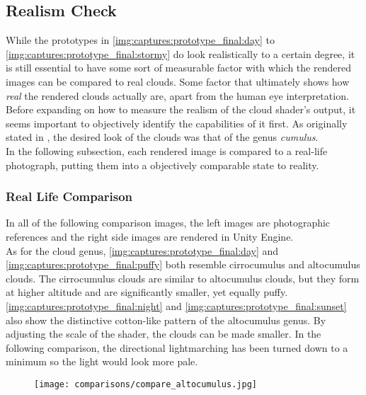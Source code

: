 \subsection{Realism Check}
\label{section:prototypes:realismcheck}
While the prototypes in \autoref{img:captures:prototype_final:day} to \autoref{img:captures:prototype_final:stormy} do look realistically to a certain degree, it is still essential to have some sort of measurable factor with which the rendered images can be compared to real clouds.
Some factor that ultimately shows how \textit{real} the rendered clouds actually are, apart from the human eye interpretation.
\\
Before expanding on how to measure the realism of the cloud shader's output, it seems important to objectively identify the capabilities of it first.
As originally stated in , the desired look of the clouds was that of the genus \textit{cumulus}.
\\
In the following subsection, each rendered image is compared to a real-life photograph, putting them into a objectively comparable state to reality.

\clearpage
\subsubsection{Real Life Comparison}
In all of the following comparison images, the left images are photographic references and the right side images are rendered in Unity Engine.
\\
As for the cloud genus, \autoref{img:captures:prototype_final:day} and \autoref{img:captures:prototype_final:puffy} both resemble cirrocumulus and altocumulus clouds.
The cirrocumulus clouds are similar to altocumulus clouds, but they form at higher altitude and are significantly smaller, yet equally puffy.
\autoref{img:captures:prototype_final:night} and \autoref{img:captures:prototype_final:sunset} also show the distinctive cotton-like pattern of the altocumulus genus.
\emptyline
By adjusting the scale of the shader, the clouds can be made smaller. In the following comparison, the directional \gls{lightmarching} has been turned down to a minimum so the light would look more pale. 

\begin{figure}[H]
    \centering
    \texttt{[image: comparisons/compare\_altocumulus.jpg]}
    \label{img:comparisons:altocumulus}
\end{figure}

